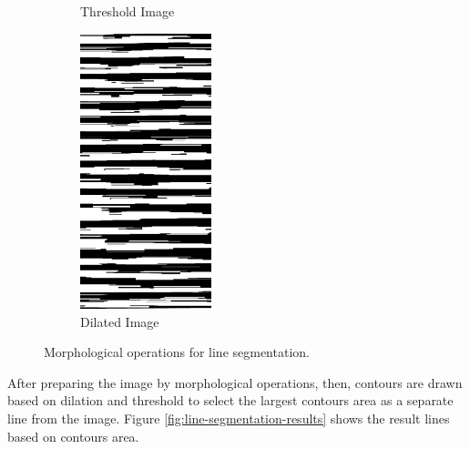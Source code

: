 \begin{figure}[H]
\begin{subfigure}[b]{0.3\textwidth}
         \caption{Threshold Image}
         \label{fig:test_Threshold}
     \end{subfigure}
     \hfill%
      \begin{subfigure}[b]{0.3\textwidth}
         \centering
         \includegraphics[width=\textwidth, height=8cm]{images/line_step7.png}
         \caption{Dilated Image}
         \label{fig:test_Dilated}
     \end{subfigure}

        \caption{Morphological operations for line segmentation.}
        \label{fig:line_segmentation}
\end{figure}


After preparing the image by morphological operations, then, contours are drawn based on dilation and threshold to select the largest contours area as a separate line from the image. Figure \ref{fig:line-segmentation-results} shows the result lines based on contours area.

\clearpage

